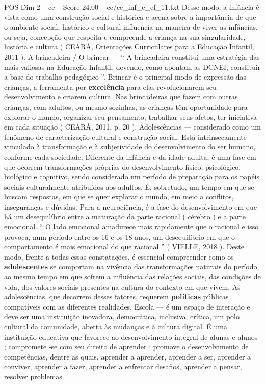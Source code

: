 \begin{textsample}{POS Dim 2 – ce – Score 24.00 – ce/ce\_inf\_e\_ef\_11.txt}
Desse modo, a infância é vista como uma construção social e histórica e acena sobre a importância de que o ambiente social, histórico e cultural influencia na maneira de viver as infâncias, ou seja, concepção que respeita e compreende a criança na sua singularidade, história e cultura ( CEARÁ, Orientações Curriculares para a Educação Infantil, 2011 ).
A brincadeira / O brincar — “ A brincadeira constitui uma estratégia das mais valiosas na Educação Infantil, devendo, como apontam as DCNEI, constituir a base do trabalho pedagógico ”.
Brincar é o principal modo de expressão das crianças, a ferramenta por \textbf{excelência} para elas revolucionarem seu desenvolvimento e criarem cultura.
Nas brincadeiras que fazem com outras crianças, com adultos, ou mesmo sozinhas, as crianças têm oportunidade para explorar o mundo, organizar seu pensamento, trabalhar seus afetos, ter iniciativa em cada situação ( CEARÁ, 2011, p. 20 ).
Adolescências — considerado como um fenômeno de caracterização cultural e construção social.
Está intrinsecamente vinculado à transformação e à subjetividade do desenvolvimento do ser humano, conforme cada sociedade.
Diferente da infância e da idade adulta, é uma fase em que ocorrem transformações próprias do desenvolvimento físico, psicológico, biológico e cognitivo, sendo considerado um período de preparação para os papéis sociais culturalmente atribuídos aos adultos.
É, sobretudo, um tempo em que se buscam respostas, em que se quer explorar o mundo, em meio a conflitos, inseguranças e dúvidas.
Para a neurociência, é a fase do desenvolvimento em que há um desequilíbrio entre a maturação da parte racional ( cérebro ) e a parte emocional. “ O lado emocional amadurece mais rapidamente que o racional e isso provoca, num período entre os 16 e os 18 anos, um desequilíbrio em que o comportamento é mais emocional do que racional ” ( VIELLE, 2018 ).
Deste modo, frente a todas essas constatações, é essencial compreender como os \textbf{adolescentes} se comportam na vivência das transformações naturais do período, ao mesmo tempo em que sofrem a influência das relações sociais, das condições de vida, dos valores sociais presentes na cultura do contexto em que vivem.
As adolescências, que decorrem desses fatores, requerem \textbf{políticas} públicas compatíveis com as diferentes realidades.
Escola — é um espaço de interação e deve ser uma instituição inovadora, democrática, inclusiva, crítica, um polo cultural da comunidade, aberta às mudanças e à cultura digital.
É uma instituição educativa que favorece ao desenvolvimento integral de alunas e alunos ; compromete -se com seu direito de aprender ; promove o desenvolvimento de competências, dentre as quais, aprender a aprender, aprender a ser, aprender a conviver, aprender a fazer, aprender a enfrentar desafios, aprender a pensar, resolver problemas.

\end{textsample}
